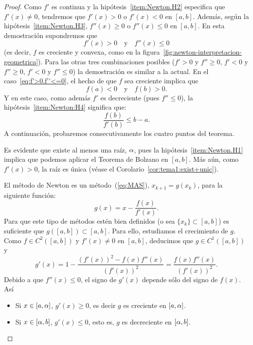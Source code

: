 \begin{proof}
  Como $f'$ es continua y la hipótesis~\ref{item:Newton.H2} especifica
  que $f'(x) \neq 0$, tendremos que $f'(x)>0$ o $f'(x)<0$ en $[a,b]$.
  Además, según la hipótesis~\ref{item:Newton.H3}, $f''(x)\ge 0$ o
  $f''(x)\le 0$ en $[a,b]$. En esta demostración supondremos que
  \begin{equation}
    f'(x)>0 \quad \text{y}\quad f''(x)\le 0
    \label{eq:f'>0.f''<=0}
  \end{equation}
  (es decir, $f$ es creciente y convexa, como en la
  figura~\ref{fig:newton-interpretacion-geometrica}). Para las otras
  tres combinaciones posibles ($f'>0$ y $f''\ge 0$, $f'<0$ y $f''\ge 0$,
  $f'<0$ y $f''\le 0$) la demostración es similar a la actual.
  En el caso~\eqref{eq:f'>0.f''<=0}, el hecho de que $f$ sea creciente implica que
  \begin{equation*}
    f(a)<0 \quad\text{y}\quad f(b)>0.
  \end{equation*}
  Y en este caso, como además $f'$ es decreciente (pues $f''\le 0$), la
  hipótesis~\ref{item:Newton:H4} significa que:
  \begin{equation}
    \frac{f(b)}{f'(b)} \le b-a.
    \label{eq:Newton:H4.simplificada}
  \end{equation}
  A continuación, probaremos consecutivamente los cuatro puntos del
  teorema.

  Es evidente que existe al menos una raíz, $\alpha$, pues la
  hipótesis~\ref{item:Newton.H1} implica que podemos aplicar el
  Teorema de Bolzano en $[a,b]$. Más aún, como $f'(x)>0$, la raíz es única (véase el
  Corolario~\ref{cor:tema1:exist+unic}).

  El método de Newton es un
  método~(\ref{eq:MAS}), $x_{k+1}=g(x_k)$, para la siguiente función:
  \begin{equation*}
    g(x)=x-\frac{f(x)}{f'(x)}.
  \end{equation*}
  Para que este tipo de métodos estén bien definidos (o sea
  $\{x_k\}\subset [a,b]$) es suficiente que $g([a,b])\subset [a,b]$.
  Para ello, estudiamos el crecimiento de $g$.
  Como $f\in C^2([a,b])$ y $f'(x)\neq 0$ en
  $[a,b]$, deducimos que $g\in C^1([a,b])$ y
  \begin{equation}
    g'(x)
    = 1-\frac{\left(f'(x)\right)^2-f(x)f''(x)}{\left(f'(x)\right)^2}
    = \frac{f(x)f''(x)}{\left(f'(x)\right)^2}.
    \label{eq:Newton.g'(x)}
  \end{equation}
  Debido a que $f''(x)\le 0$, el signo de $g'(x)$ depende sólo del
  signo de $f(x)$. Así
  \begin{itemize}%
  \item Si $x\in [a,\alpha]$, $g'(x)\ge 0$, es decir $g$ es creciente en
    $[a,\alpha]$.
  \item Si $x\in [\alpha,b]$, $g'(x)\le 0$, esto es, $g$ es decreciente
    en $[\alpha,b]$.
  \end{itemize}


\end{proof}
